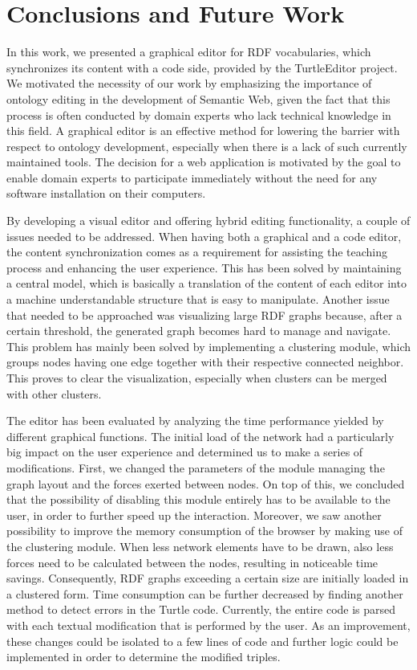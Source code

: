 \chapter{Conclusions and Future Work}
\label{ch:conclusions}


In this work, we presented a graphical editor for RDF vocabularies, which synchronizes its content with a code side, provided by the TurtleEditor project. We motivated the necessity of our work by emphasizing the importance of ontology editing in the development of Semantic Web, given the fact that this process is often conducted by domain experts who lack technical knowledge in this field. A graphical editor is an effective method for lowering the barrier with respect to ontology development, especially when there is a lack of such currently maintained tools. The decision for a web application is motivated by the goal to enable domain experts to participate immediately without the need for any software installation on their computers.

By developing a visual editor and offering hybrid editing functionality, a couple of issues needed to be addressed. When having both a graphical and a code editor, the content synchronization comes as a requirement for assisting the teaching process and enhancing the user experience. This has been solved by maintaining a central model, which is basically a translation of the content of each editor into a machine understandable structure that is easy to manipulate. Another issue that needed to be approached was visualizing large RDF graphs because, after a certain threshold, the generated graph becomes hard to manage and navigate. This problem has mainly been solved by implementing a clustering module, which groups nodes having one edge together with their respective connected neighbor. This proves to clear the visualization, especially when clusters can be merged with other clusters.

The editor has been evaluated by analyzing the time performance yielded by different graphical functions. The initial load of the network had a particularly big impact on the user experience and determined us to make a series of modifications. First, we changed the parameters of the module managing the graph layout and the forces exerted between nodes. On top of this, we concluded that the possibility of disabling this module entirely has to be available to the user, in order to further speed up the interaction. Moreover, we saw another possibility to improve the memory consumption of the browser by making use of the clustering module. When less network elements have to be drawn, also less forces need to be calculated between the nodes, resulting in noticeable time savings. Consequently, RDF graphs exceeding a certain size are initially loaded in a clustered form. Time consumption can be further decreased by finding another method to detect errors in the Turtle code. Currently, the entire code is parsed with each textual modification that is performed by the user. As an improvement, these changes could be isolated to a few lines of code and further logic could be implemented in order to determine the modified triples.

